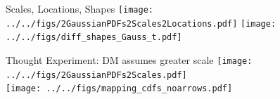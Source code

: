 
\begin{frame}{Scales, Locations, Shapes}
\centering
	\texttt{[image: ../../figs/2GaussianPDFs2Scales2Locations.pdf]}
	\texttt{[image: ../../figs/diff\_shapes\_Gauss\_t.pdf]}
\end{frame}

\begin{frame}{Thought Experiment: DM assumes greater scale}
\centering
	\texttt{[image: ../../figs/2GaussianPDFs2Scales.pdf]} \\
	\texttt{[image: ../../figs/mapping\_cdfs\_noarrows.pdf]} \\
\end{frame}

